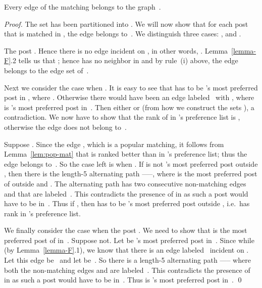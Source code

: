 \documentclass[11pt]{llncs}
\begin{document}
\begin{lemma}
\label{lem:main}
Every edge of the matching  belongs to the graph~.
\end{lemma}
\begin{proof}
The set  has been partitioned into . We will now show that for each post  that is matched in , the edge  belongs to~. We distinguish three cases: ,  and .

\smallskip

 The post . Hence there is no  edge incident on 
, in other words, .
Lemma~\ref{lemma-F}.2 tells us that ; 
hence  has no neighbor in  and by rule~(i) above, 
the edge  belongs to the edge set of~.


\smallskip

 Next we consider the case when .
It is easy to see that  has to be 's most preferred post in , where 
. 
Otherwise there would have been an edge  labeled~ with , 
where  is 's most preferred post in~. Then either  or
 (from how we construct the sets ), a contradiction.
We now have to show that the rank of  in 's preference list is , 
otherwise the edge  does not belong to~.

Suppose . Since the edge , which is a popular matching, it follows 
from Lemma~\ref{lem:pop-mat} that  is ranked better than  in 's preference 
list; thus the edge  belongs to~. So the case left is when . 
If  is not 's most preferred post outside , then there is the length-5 alternating 
path -----, 
where  is the most preferred post of  outside  and .
The alternating path  has two consecutive non-matching edges  and 
 that are labeled~. This contradicts the presence of  in  as such 
a post would have to be in~.
Thus if , then  has to be 's most preferred post outside , i.e.\
 has rank  in 's preference list.

\smallskip

 We finally consider the case when the post . 
We need to show that  is the most preferred post of  in~. 
Suppose not. 
Let  be 's most preferred post in~. Since  while  (by Lemma~\ref{lemma-F}.1), we know that there is an 
edge labeled~ incident on . Let this edge be~ and let  
be~. So there is a length-5 alternating path ----- 
where both the non-matching edges  and  are labeled~. This contradicts 
the presence of  in  as such a post would have to be in~.
Thus  is 's most preferred post in~. \qed
\end{proof}
\end{document}
